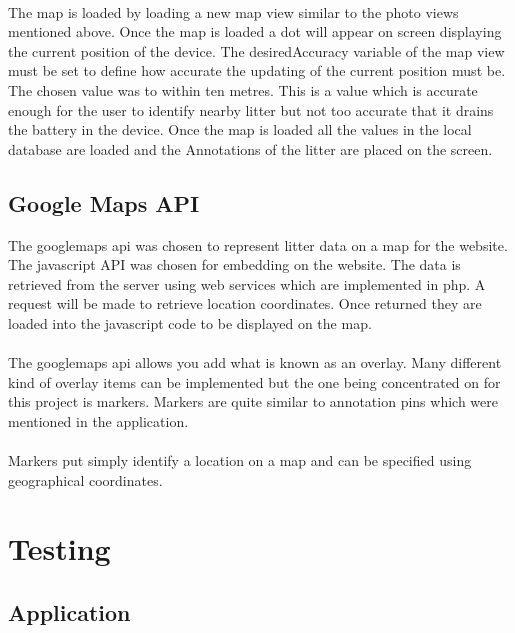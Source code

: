 \documentclass[12pt]{article}
\begin{document}
\paragraph{}
The map is loaded by loading a new map view similar to the photo views mentioned above. Once the map is loaded a dot will appear on screen displaying the current position of the device. The desiredAccuracy variable of the map view must be set to define how accurate the updating of the current position must be. The chosen value was to within ten metres. This is a value which is accurate enough for the user to identify nearby litter but not too accurate that it drains the battery in the device. Once the map is loaded all the values in the local database are loaded and the Annotations of the litter are placed on the screen. 

\subsection{Google Maps API}

The \gls{googlemaps} \gls{api} was chosen to represent litter data on a map for the website.  
The javascript API was chosen for embedding on the website. 
The data is retrieved from the server using web services which are implemented in \gls{php}. A request will be made to retrieve location coordinates. Once returned they are loaded into the javascript code to be displayed on the map. 

\paragraph{}

The \gls{googlemaps} \gls{api} allows you add what is known as an overlay. Many different kind of overlay items can be implemented but the one being concentrated on for this project is markers. Markers are quite similar to annotation pins which were mentioned in the application. 

\paragraph{}
Markers put simply identify a location on a map and can be specified using geographical coordinates. 

\section{Testing}
\subsection{Application}
\end{document}
